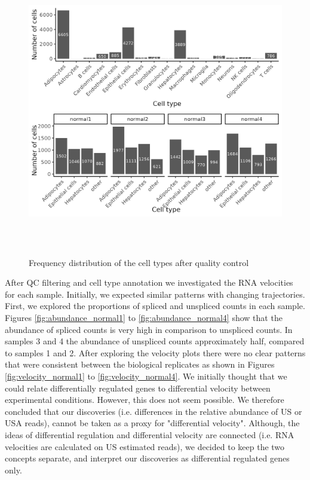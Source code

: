 \begin{figure}[!htb]
\begin{center}
\includegraphics[width=6in,height=5in]{../figures/kidney_mouse/cell_type_distribution.png}
\end{center}
\caption{Frequency distribution of the cell types after quality control} 
\label{fig:mouse_cell_type}
\end{figure}

After QC filtering and cell type annotation we investigated the RNA velocities for each sample. Initially, we expected similar patterns with changing trajectories. First, we explored the proportions of spliced and unspliced counts in each sample. Figures \ref{fig:abundance_normal1} to \ref{fig:abundance_normal4} show that the abundance of spliced counts is very high in comparison to unspliced counts. In samples 3 and 4 the abundance of unspliced counts approximately half, compared to samples 1 and 2. After exploring the velocity plots there were no clear patterns that were consistent between the biological replicates as shown in Figures \ref{fig:velocity_normal1} to \ref{fig:velocity_normal4}. We initially thought that we could relate differentially regulated genes to differential velocity between experimental conditions. However, this does not seem possible. We therefore concluded that our discoveries (i.e. differences in the relative abundance of US or USA reads), cannot be taken as a proxy for "differential velocity". Although, the ideas of differential regulation and differential velocity are connected (i.e. RNA velocities are calculated on US estimated reads), we decided to keep the two concepts separate, and interpret our discoveries as differential regulated genes only.

